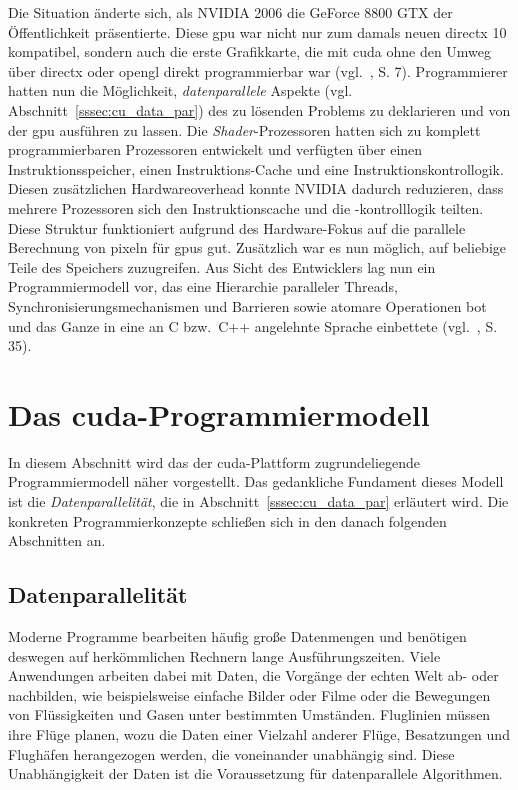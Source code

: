 Die Situation änderte sich, als NVIDIA{\textregistered} 2006 die GeForce{\textregistered} 8800 GTX der Öffentlichkeit
präsentierte. Diese \gls{gpu} war nicht nur zum damals neuen \gls{directx} 10 kompatibel, sondern auch die erste
Grafikkarte, die mit \gls{cuda} ohne den Umweg über \gls{directx} oder \gls{opengl} direkt programmierbar war
(vgl.~\cite{sandkand}, S. 7). Programmierer hatten nun die Möglichkeit, \textit{datenparallele} Aspekte
(vgl. Abschnitt~\ref{sssec:cu_data_par}) des zu lösenden Problems zu deklarieren und von der \gls{gpu} ausführen zu
lassen. Die \textit{Shader}-Prozessoren hatten sich zu komplett programmierbaren Prozessoren entwickelt und verfügten
über einen Instruktionsspeicher, einen Instruktions-Cache und eine Instruktionskontrollogik. Diesen zusätzlichen
Hardwareoverhead konnte NVIDIA{\textregistered} dadurch reduzieren, dass mehrere Prozessoren sich den Instruktionscache
und die -kontrolllogik teilten. Diese Struktur funktioniert aufgrund des Hardware-Fokus auf die parallele Berechnung von
\gls{pixel}n für \gls{gpu}s gut. Zusätzlich war es nun möglich, auf beliebige Teile des Speichers zuzugreifen. Aus Sicht
des Entwicklers lag nun ein Programmiermodell vor, das eine Hierarchie paralleler Threads, Synchronisierungsmechanismen
und Barrieren sowie atomare Operationen bot und das Ganze in eine an C bzw.\ C++ angelehnte Sprache einbettete
(vgl.~\cite{kirkhwu}, S. 35).

\section{Das \gls{cuda}-Programmiermodell}

In diesem Abschnitt wird das der \gls{cuda}-Plattform zugrundeliegende Programmiermodell näher vorgestellt. Das
gedankliche Fundament dieses Modell ist die \textit{Datenparallelität}, die in Abschnitt~\ref{sssec:cu_data_par}
erläutert wird. Die konkreten Programmierkonzepte schließen sich in den danach folgenden Abschnitten an.

\subsection{Datenparallelität}\label{ssec:cu_data_par}

Moderne Programme bearbeiten häufig große Datenmengen und benötigen deswegen auf herkömmlichen Rechnern lange
Ausführungszeiten. Viele Anwendungen arbeiten dabei mit Daten, die Vorgänge der echten Welt ab- oder nachbilden, wie
beispielsweise einfache Bilder oder Filme oder die Bewegungen von Flüssigkeiten und Gasen unter bestimmten Umständen.
Fluglinien müssen ihre Flüge planen, wozu die Daten einer Vielzahl anderer Flüge, Besatzungen und Flughäfen herangezogen
werden, die voneinander unabhängig sind. Diese Unabhängigkeit der Daten ist die Voraussetzung für datenparallele
Algorithmen.

